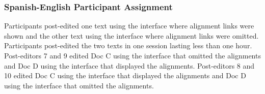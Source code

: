 



\subsubsection{Spanish-English Participant Assignment}

Participants post-edited one text using the interface where alignment links were shown and the other text using the interface where alignment links were omitted. 
%
Participants post-edited the two texts in one session lasting less than one hour. 
%
Post-editors 7 and 9 edited Doc C using the interface that omitted the alignments and Doc D using the interface that displayed the alignments. 
%
Post-editors 8 and 10 edited Doc C using the interface that displayed the alignments and Doc D using the interface that omitted the alignments.





